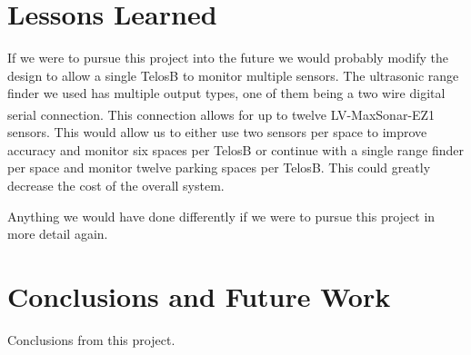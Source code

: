 \documentclass{acm_proc}
\begin{document}
\section{Lessons Learned}\label{sec:lessons}

If we were to pursue this project into the future we would probably modify the design to allow a single TelosB to monitor multiple sensors.  The ultrasonic range finder we used has multiple output types, one of them being a two wire digital serial connection.  This connection allows for up to twelve LV-MaxSonar\textsuperscript{\textregistered}-EZ1\textsuperscript{\texttrademark} sensors.  This would allow us to either use two sensors per space to improve accuracy and monitor six spaces per TelosB or continue with a single range finder per space and monitor twelve parking spaces per TelosB.  This could greatly decrease the cost of the overall system.

Anything we would have done differently if we were to pursue this project
in more detail again.

\section{Conclusions and Future Work}\label{sec:conclusions}

Conclusions from this project.



\end{document}
